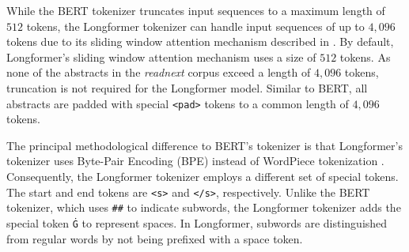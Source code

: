 While the BERT tokenizer truncates input sequences to a maximum length of $512$ tokens, the Longformer tokenizer can handle input sequences of up to $4,096$ tokens due to its sliding window attention mechanism described in .
By default, Longformer's sliding window attention mechanism uses a size of $512$ tokens.
As none of the abstracts in the \emph{readnext} corpus exceed a length of $4,096$ tokens, truncation is not required for the Longformer model. Similar to BERT, all abstracts are padded with special \texttt{<pad>} tokens to a common length of $4,096$ tokens.

The principal methodological difference to BERT's tokenizer is that Longformer's tokenizer uses Byte-Pair Encoding (BPE) \cite{SennrichNeuralMachine2016} instead of WordPiece tokenization \cite{WuGoogleNeural2016}. Consequently, the Longformer tokenizer employs a different set of special tokens. The start and end tokens are \texttt{<s>} and \texttt{</s>}, respectively. Unlike the BERT tokenizer, which uses \texttt{\#\#} to indicate subwords, the Longformer tokenizer adds the special token \texttt{Ġ} to represent spaces. In Longformer, subwords are distinguished from regular words by not being prefixed with a space token.

